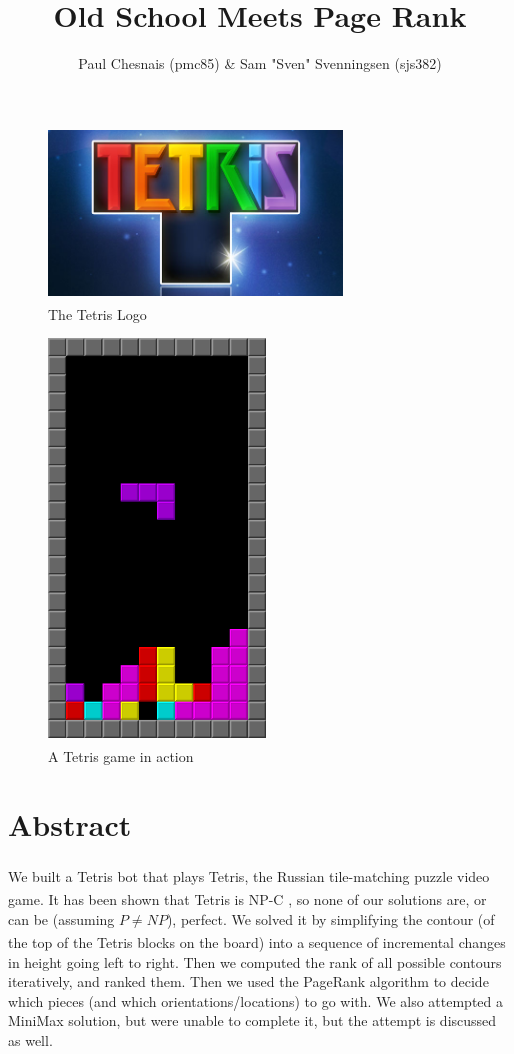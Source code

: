 \documentclass[ fontsize=11pt]{article}
\title{Old School \tetris{} Meets Page Rank}
\author{Paul Chesnais (pmc85) \& Sam "Sven" Svenningsen (sjs382)}
\date{}
\def\tetris{Tetris\textsuperscript{\textregistered}}
\begin{document}
\maketitle
\thispagestyle{empty}
\begin{figure}[H]
  \centering
  \includegraphics[height=125pt]{tetris}
  \caption{The \tetris{} Logo}
  \label{fig:the_tetris}
\end{figure}
\begin{figure}[H]
  \centering
  \includegraphics[height=300pt]{tetris_screen}
  \caption{A \tetris{} game in action}
  \label{fig:the_tetris_board}
\end{figure}
\newpage
\section{Abstract}
\label{sec:abstract}

\par We built a \tetris{} bot that plays \tetris{}, the Russian tile-matching puzzle video game. It has been shown that \tetris{} is NP-C \cite{tetrishard}, so none of our solutions are, or can be (assuming $P \neq NP$), perfect.  We solved it by simplifying the contour (of the top of the \tetris{} blocks on the board) into a sequence of incremental changes in height going left to right. Then we computed the rank of all possible contours iteratively, and ranked them. Then we used the PageRank algorithm to decide which pieces (and which orientations/locations) to go with. We also attempted a MiniMax solution, but were unable to complete it, but the attempt is discussed as well.
\end{document}
